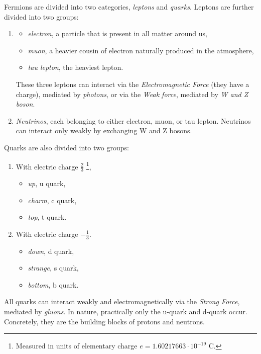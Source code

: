 Fermions are divided into two categories, \emph{leptons} and \emph{quarks}. 
Leptons are further divided into two groups:
\begin{enumerate}
    \item  
    \begin{itemize}
        \item \emph{electron}, a particle that is present in all matter around us,
        \item \emph{muon}, a heavier cousin of electron naturally produced in the atmosphere,
        \item \emph{tau lepton}, the heaviest lepton.
    \end{itemize}
    These three leptons can interact via the \emph{Electromagnetic Force} (they have a charge), mediated by \emph{photons}, or via the \emph{Weak force}, mediated by \emph{W and Z boson}. 
    \item \emph{Neutrinos}, each belonging to either electron, muon, or tau lepton.  
    Neutrinos can interact only weakly by exchanging W and Z bosons.
\end{enumerate}
Quarks are also divided into two groups:
\begin{multicols}{2}
\begin{enumerate}
    \item  
    With electric charge $\frac{2}{3}$ \footnote{Measured in units of elementary charge $e=1.60217663\cdot10^{-19}$ C.},
    \begin{itemize}
        \item \emph{up}, u quark,
        \item \emph{charm}, c quark,
        \item \emph{top}, t quark.
    \end{itemize}
    \item  
    With electric charge $-\frac{1}{3}$.
    \begin{itemize}
        \item \emph{down}, d quark,
        \item \emph{strange}, s quark,
        \item \emph{bottom}, b quark.
    \end{itemize}
\end{enumerate}
\end{multicols}
All quarks can interact weakly and electromagnetically via the \emph{Strong Force}, mediated by \emph{gluons}.
In nature, practically only the u-quark and d-quark occur. 
Concretely, they are the building blocks of protons and neutrons.

